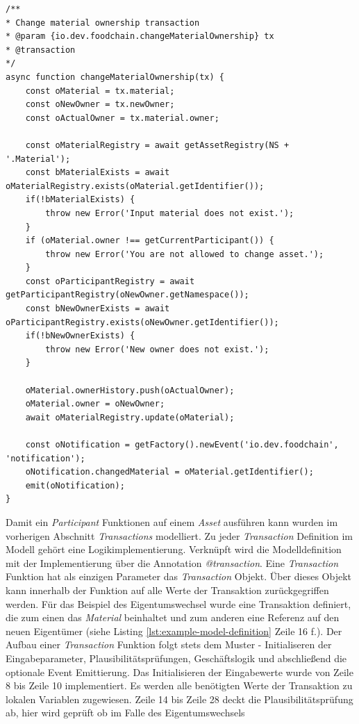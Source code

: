 \begin{lstlisting}[caption={Transaction Processor Function \textit{changeMaterialOwnership(tx)}},language=ES6,label=lst:transaction-logic-change-ownership]
/**
* Change material ownership transaction
* @param {io.dev.foodchain.changeMaterialOwnership} tx
* @transaction
*/
async function changeMaterialOwnership(tx) {
    const oMaterial = tx.material;
    const oNewOwner = tx.newOwner;
    const oActualOwner = tx.material.owner;

    const oMaterialRegistry = await getAssetRegistry(NS + '.Material');
    const bMaterialExists = await oMaterialRegistry.exists(oMaterial.getIdentifier());
    if(!bMaterialExists) {
        throw new Error('Input material does not exist.');
    }
    if (oMaterial.owner !== getCurrentParticipant()) {
        throw new Error('You are not allowed to change asset.');
    }
    const oParticipantRegistry = await getParticipantRegistry(oNewOwner.getNamespace());
    const bNewOwnerExists = await oParticipantRegistry.exists(oNewOwner.getIdentifier());
    if(!bNewOwnerExists) {
        throw new Error('New owner does not exist.');
    }

    oMaterial.ownerHistory.push(oActualOwner);
    oMaterial.owner = oNewOwner;
    await oMaterialRegistry.update(oMaterial);

    const oNotification = getFactory().newEvent('io.dev.foodchain', 'notification');
    oNotification.changedMaterial = oMaterial.getIdentifier();
    emit(oNotification);
}
\end{lstlisting}

Damit ein \textit{Participant} Funktionen auf einem \textit{Asset} ausführen kann wurden im vorherigen Abschnitt \textit{Transactions} modelliert. Zu jeder \textit{Transaction} Definition im Modell gehört eine Logikimplementierung. Verknüpft wird die Modelldefinition mit der Implementierung über die Annotation \textit{@transaction}. Eine \textit{Transaction} Funktion hat als einzigen Parameter das \textit{Transaction} Objekt. Über dieses Objekt kann innerhalb der Funktion auf alle Werte der Transaktion zurückgegriffen werden. Für das Beispiel des Eigentumswechsel wurde eine Transaktion definiert, die zum einen das \textit{Material} beinhaltet und zum anderen eine Referenz auf den neuen Eigentümer (siehe Listing \ref{lst:example-model-definition} Zeile 16 f.). Der Aufbau einer \textit{Transaction} Funktion folgt stets dem Muster - Initialiseren der Eingabeparameter, Plausibilitätsprüfungen, Geschäftslogik und abschließend die optionale Event Emittierung. Das Initialisieren der Eingabewerte wurde von Zeile 8 bis Zeile 10 implementiert. Es werden alle benötigten Werte der Transaktion zu lokalen Variablen zugewiesen. Zeile 14 bis Zeile 28 deckt die Plausibilitätsprüfung ab, hier wird geprüft ob im Falle des Eigentumswechsels

